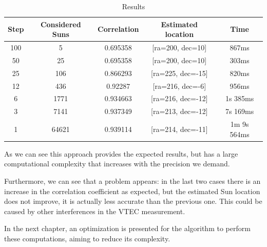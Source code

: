 \begin{table}[h!]
	\centering
	\def\arraystretch{1.2}
	\begin{tabular}{|c c c c c|} 
		\hline
		Step & Considered Suns & Correlation & Estimated location & Time \\ [0.5ex] 
		\hline\hline
		100 & 5 & 0.695358 & [ra=200, dec=10] & 867ms \\
		\hline 
		50 & 25 & 0.695358 & [ra=200, dec=10] & 303ms \\
			\hline 
		25 & 106 & 0.866293 & [ra=225, dec=-15] & 820ms \\
			\hline 
		12 & 436 & 0.92287 & [ra=216, dec=-6] & 956ms \\
			\hline 
		6 & 1771 & 0.934663 & [ra=216, dec=-12] & 1s 385ms \\
			\hline 
		3 & 7141 & 0.937349 & [ra=213, dec=-12] & 7s 169ms \\
			\hline 
		1 & 64621 & 0.939114 & [ra=214, dec=-11] & 1m 9s 564ms \\
		\hline 
	\end{tabular}
	\caption{Results}
\end{table}

As we can see this approach provides the expected results, but has a large computational complexity that increases with the precision we demand. 

Furthermore, we can see that a problem appears: in the last two cases there is an increase in the correlation coefficient as expected, but the estimated Sun location does not improve, it is actually less accurate than the previous one. This could be caused by other interferences in the VTEC measurement.

In the next chapter, an optimization is presented for the algorithm to perform these computations, aiming to reduce its complexity.